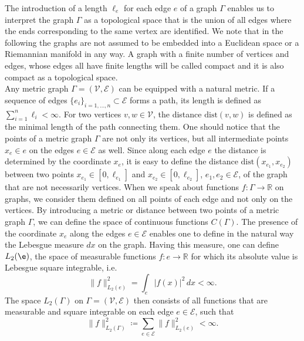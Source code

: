 The introduction of a length $\ell_e$ for each edge $e$ of a graph $\Gamma$ enables us to interpret the graph $\Gamma$ as a topological space that is the union of all edges where the ends corresponding to the same vertex are identified. We note that in the following the graphs are not assumed to be embedded into a Euclidean space or a Riemannian manifold in any way. A graph with a finite number of vertices and edges, whose edges all have finite lengths will be called compact and it is also compact as a topological space. \\
Any metric graph $\Gamma = (\mathcal{V}, \mathcal{E})$ can be equipped with a natural metric. If a sequence of edges $\{ e_i \}_{i = 1, \ldots, n} \subset \mathcal{E}$ forms a path, its length is defined as $\sum^{n}_{i=1} \ell_i < \infty$. For two vertices $v, w \in \mathcal{V}$, the distance $\mathrm{dist}(v,w)$ is defined as the minimal length of the path connecting them. One should notice that the points of a metric graph $\Gamma$ are not only its vertices, but all intermediate points $x_e \in e$ on the edges $e \in \mathcal{E}$ as well. Since along each edge $e$ the distance is determined by the coordinate $x_e$, it is easy to define the distance $\mathrm{dist}(x_{e_1},x_{e_2})$ between two points $x_{e_1} \in [0, \ell_{e_1}]$ and $x_{e_2} \in [0, \ell_{e_2}]$, $e_1, e_2 \in \mathcal{E}$, of the graph that are not necessarily vertices. When we speak about functions $f \colon \Gamma \to \mathbb{R}$ on graphs, we consider them defined on all points of each edge and not only on the vertices. By introducing a metric or distance between two points of a metric graph $\Gamma$, we can define the space of continuous functions $C(\Gamma)$. The presence of the coordinate $x_e$ along the edges $e \in \mathcal{E}$ enables one to define in the natural way the Lebesgue measure $dx$ on the graph. Having this measure, one can define $L_2(\e)$, the space of measurable functions $f \colon e \to \mathbb{R}$ for which its absolute value is Lebesgue square integrable, i.e.
\begin{equation*}
    \lVert f \rVert^{2}_{L_2(e)} = \int_e \lvert f(x) \rvert^2 \, dx < \infty.
\end{equation*}
The space $L_2(\Gamma)$ on $\Gamma = (\mathcal{V}, \mathcal{E})$ then consists of all functions that are measurable and square integrable on each edge $e \in \mathcal{E}$, such that 
\begin{equation*} 
    \lVert f \rVert^{2}_{L_2(\Gamma)} \coloneqq \sum_{e \in \mathcal{E}} \lVert f \rVert^{2}_{L_2(e)} < \infty.
\end{equation*} 
